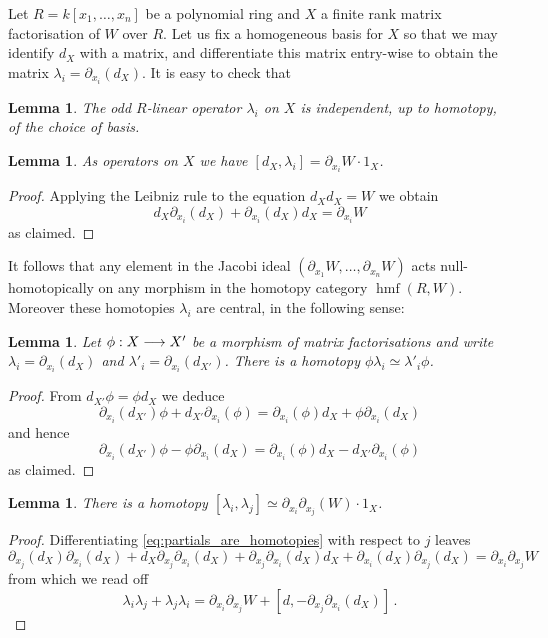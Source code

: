 \documentclass[english,letter paper,12pt,leqno]{article}
\newtheorem{lemma}[theorem]{Lemma}
\theoremstyle{example}
\numberwithin{equation}{section}
\def\be{\begin{equation}}
\def\ee{\end{equation}}
\DeclareMathOperator{\hmf}{hmf}
\begin{document}
Let $R = k[x_1,\ldots,x_n]$ be a polynomial ring and $X$ a finite rank matrix factorisation of $W$ over $R$. Let us fix a homogeneous basis for $X$ so that we may identify $d_X$ with a matrix, and differentiate this matrix entry-wise to obtain the matrix $\lambda_i = \partial_{x_i}(d_X)$. It is easy to check that

\begin{lemma}\label{lemma:homotopy_indept} The odd $R$-linear operator $\lambda_i$ on $X$ is independent, up to homotopy, of the choice of basis.
\end{lemma}

\begin{lemma} As operators on $X$ we have $[ d_X, \lambda_i ] = \partial_{x_i} W \cdot 1_X$.
\end{lemma}
\begin{proof}
Applying the Leibniz rule to the equation $d_X d_X = W$ we obtain
\be\label{eq:partials_are_homotopies}
d_X \partial_{x_i}(d_X) + \partial_{x_i}(d_X) d_X = \partial_{x_i} W
\ee
as claimed.
\end{proof}

It follows that any element in the Jacobi ideal $( \partial_{x_1}W , \ldots, \partial_{x_n} W )$ acts null-homotopically on any morphism in the homotopy category $\hmf(R,W)$. Moreover these homotopies $\lambda_i$ are central, in the following sense:

\begin{lemma}\label{lemma:naturalityoflambda} Let $\phi: X \longrightarrow X'$ be a morphism of matrix factorisations and write $\lambda_i = \partial_{x_i}(d_X)$ and $\lambda'_i = \partial_{x_i}(d_{X'})$. There is a homotopy $\phi \lambda_i \simeq \lambda'_i \phi$.
\end{lemma}
\begin{proof}
From $d_{X'} \phi = \phi d_X$ we deduce
\[
\partial_{x_i}( d_{X'} ) \phi + d_{X'} \partial_{x_i}( \phi ) = \partial_{x_i}( \phi ) d_X + \phi \partial_{x_i}( d_X )
\]
and hence
\[
\partial_{x_i}( d_{X'} ) \phi - \phi \partial_{x_i}( d_X ) = \partial_{x_i}(\phi) d_X - d_{X'} \partial_{x_i}(\phi)
\]
as claimed.
\end{proof}

\begin{lemma}\label{lemma:commutator_of_lambdas} There is a homotopy $[ \lambda_i, \lambda_j ] \simeq \partial_{x_i} \partial_{x_j}(W) \cdot 1_X$.
\end{lemma}
\begin{proof}
Differentiating \eqref{eq:partials_are_homotopies} with respect to $j$ leaves
\[
\partial_{x_j}(d_X) \partial_{x_i}(d_X) + d_X \partial_{x_j} \partial_{x_i}(d_X) + \partial_{x_j} \partial_{x_i}(d_X) d_X + \partial_{x_i}(d_X) \partial_{x_j}(d_X) = \partial_{x_i} \partial_{x_j}W
\]
from which we read off
\[
\lambda_i \lambda_j + \lambda_j \lambda_i = \partial_{x_i} \partial_{x_j}W + [d, -\partial_{x_j} \partial_{x_i}(d_X)]\,.
\]
\end{proof}
\end{document}
